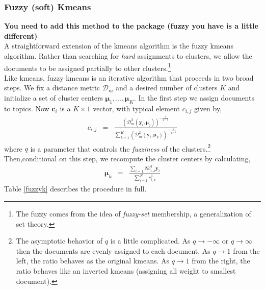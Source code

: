 \documentclass[11pt,letterpaper]{article}
\numberwithin{equation}{section}
\begin{document}
\subsubsection{Fuzzy (soft) Kmeans} \textbf{You need to add this
method to the package (fuzzy you have
is a little different)} \\

A straightforward extension of the kmeans algorithm is the fuzzy
kmeans algorithm. Rather than searching for \emph{hard} assignments
to clusters, we allow the documents to be assigned partially to
other clusters.\footnote{The fuzzy comes from the idea of
\emph{fuzzy-set} membership, a generalization of set theory. }  \\
\indent Like kmeans, fuzzy kmeans is an iterative algorithm that
proceeds in two broad steps.  We fix a distance metric
$\mathcal{D}_m$ and a desired number of clusters $K$ and initialize
a set of cluster centers $\boldsymbol{\mu}_1, \hdots,
\boldsymbol{\mu}_K$.  In the first step we assign documents to
topics.  Now $\boldsymbol{c}_i$ is a $K \times 1$ vector, with
typical element $c_{i,j}$ given by,
\begin{eqnarray}
c_{i,j} & = & \frac{\left( \mathcal{D}^2_m (\boldsymbol{y}_i,
\boldsymbol{\mu}_j)\right)^{-\frac{1}{q-1}}}{\sum_{k=1}^{K}
\left(\mathcal{D}^2_m (\boldsymbol{y}_i, \boldsymbol{\mu}_k)
\right)^{-\frac{1}{q-1}} } \nonumber
\end{eqnarray}
where $q$ is a parameter that controls the \emph{fuzziness} of the
clusters.\footnote{The asymptotic behavior of $q$ is a little
complicated.  As $q \rightarrow - \infty$ or $q \rightarrow \infty$
then the documents are evenly assigned to each document.  As $q
\rightarrow 1$ from the left, the ratio behaves as the original
kmeans.  As $q \rightarrow 1$ from the right, the ratio behaves like
an inverted kmeans (assigning all weight to smallest document).}
Then,conditional on this step, we recompute the cluster centers by
calculating,
\begin{eqnarray}
\boldsymbol{\mu}_k & = & \frac{\sum_{i=1}{N} c_{i,k}^q
\boldsymbol{y}_i }{\sum_{i=1}^{N} c^{q}_{i,k} } \nonumber
\end{eqnarray}
Table \ref{fuzzyk} describes the procedure in full.
\begin{table}[hbt!]
\caption{Fuzzy Kmeans algorithm}\label{fuzzyk} 
\end{table}
\end{document}
